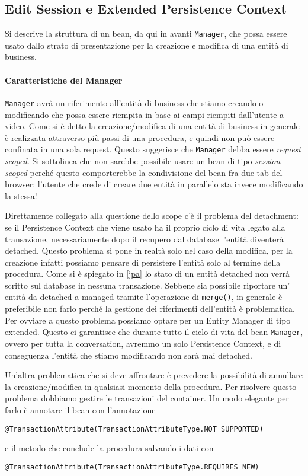 \subsection{Edit Session e Extended Persistence Context}
Si descrive la struttura di un bean, da qui in avanti \texttt{Manager}, che possa essere usato dallo strato di presentazione per la creazione e modifica di una entità di business.

\paragraph{Caratteristiche del Manager}
\texttt{Manager} avrà un riferimento all'entità di business che stiamo creando o modificando che possa essere riempita in base ai campi riempiti dall'utente a video.
Come si è detto la creazione/modifica di una entità di business in generale è realizzata attraverso più passi di una procedura, e quindi non può essere confinata in una sola request. Questo suggerisce che \texttt{Manager} debba essere 
\textsl{request scoped}. Si sottolinea che non sarebbe possibile usare un bean di tipo \textsl{session scoped} perché questo comporterebbe la condivisione del bean fra due tab del browser: l'utente che crede di creare due entità in parallelo
sta invece modificando la stessa!

Direttamente collegato alla questione dello scope c'è il problema del detachment: se il Persistence Context che viene usato ha il proprio ciclo di vita legato alla transazione, necessariamente dopo il recupero dal database l'entità diventerà
detached. Questo problema si pone in realtà solo nel caso della modifica, per la creazione infatti possiamo pensare di persistere l'entità solo al termine della procedura. Come si è spiegato in \ref{jpa} lo stato di un entità detached non verrà scritto sul database in nessuna transazione. Sebbene sia possibile riportare un' entità da detached a managed tramite
l'operazione di \texttt{merge()}, in generale è preferibile non farlo perché la gestione dei riferimenti dell'entità è problematica. Per ovviare a questo problema possiamo optare per un Entity Manager di tipo extended. Questo ci garantisce
che durante tutto il ciclo di vita del bean \texttt{Manager}, ovvero per tutta la conversation, avremmo un solo Persistence Context, e di conseguenza l'entità che stiamo modificando non sarà mai detached.

Un'altra problematica che si deve affrontare è prevedere la possibilità di annullare la creazione/modifica in qualsiasi momento della procedura. Per risolvere questo problema dobbiamo gestire le transazioni del container.
Un modo elegante per farlo è annotare il bean con l'annotazione 
\begin{lstlisting} 
@TransactionAttribute(TransactionAttributeType.NOT_SUPPORTED)
\end{lstlisting}
e il metodo che conclude la procedura salvando i dati con 
\begin{lstlisting}
@TransactionAttribute(TransactionAttributeType.REQUIRES_NEW)
\end{lstlisting}



